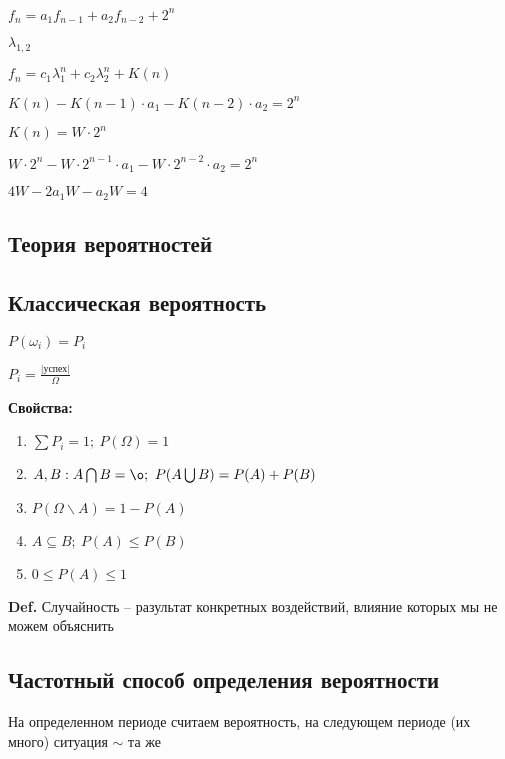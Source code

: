 \documentclass[14pt, letter paper]{article}
\begin{document}
$f_n = a_1f_{n-1} + a_2f_{n-2} + 2^n$

$\lambda_{1,2}$

$f_n = c_1\lambda_1^n + c_2\lambda_2^n + K(n)$

$K(n) - K(n-1) \cdot a_1 - K(n-2) \cdot a_2 = 2^n$

$K(n) = W \cdot 2^n$

$W \cdot 2^n - W \cdot 2^{n-1} \cdot a_1 - W \cdot 2^{n-2} \cdot a_2 = 2^n$

$4W - 2a_1W - a_2W = 4$

\vspace{5mm}

\begin{center}
    \section*{Теория вероятностей}

    \subsection*{Классическая вероятность}
\end{center}

$P(\omega_i) = P_i$

$P_i = \frac{|\text{успех}|}{\Omega}$

\textbf{Свойства:}

\begin{enumerate}
    \item $\sum P_i = 1;\ P(\Omega) = 1$
    \item $A, B : A \bigcap B = \o;\ P(A \bigcup B) = P(A) + P(B)$
    \item $P(\Omega \backslash A) = 1 - P(A)$
    \item $A \subseteq B;\ P(A) \leq P(B)$
    \item $0 \leq P(A) \leq 1$
\end{enumerate}

\textbf{Def.} Случайность -- разультат конкретных воздействий, влияние которых мы не можем объяснить

\begin{center}
    \subsection*{Частотный способ определения вероятности}
\end{center}

На определенном периоде считаем вероятность, на следующем периоде (их много) ситуация $\sim$ та же
\end{document}
